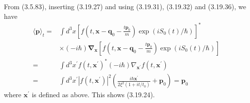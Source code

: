 \documentclass{article}
\begin{document}
From (3.5.83), inserting (3.19.27) and using (3.19.31), (3.19.32) and (3.19.36), we have
$$
\begin{align*}
\langle\boldsymbol{p}\rangle_{t}= & \int d^{3} x\left[f\left(t, \boldsymbol{x}-\boldsymbol{q}_{0}-\frac{t \boldsymbol{p}_{0}}{m}\right) \exp \left(i S_{0}(t) / \hbar\right)\right]^{*}  \tag{3.19.37}\\
& \times(-i \hbar) \boldsymbol{\nabla}_{\boldsymbol{x}}\left[f\left(t, \boldsymbol{x}-\boldsymbol{q}_{0}-\frac{t \boldsymbol{p}_{0}}{m}\right) \exp \left(i S_{0}(t) / \hbar\right)\right] \\
= & \int d^{3} x^{\prime} f\left(t, \boldsymbol{x}^{\prime}\right)^{*}(-i \hbar) \nabla_{\boldsymbol{x}^{\prime}} f\left(t, \boldsymbol{x}^{\prime}\right) \\
= & \int d^{3} x^{\prime}\left|f\left(t, \boldsymbol{x}^{\prime}\right)\right|^{2}\left(\frac{i \hbar \boldsymbol{x}^{\prime}}{2 \xi^{2}\left(1+i t / t_{0}\right)}+\boldsymbol{p}_{0}\right)=\boldsymbol{p}_{0}
\end{align*}
$$
where $\boldsymbol{x}^{\prime}$ is defined as above. This shows (3.19.24).
\end{document}
